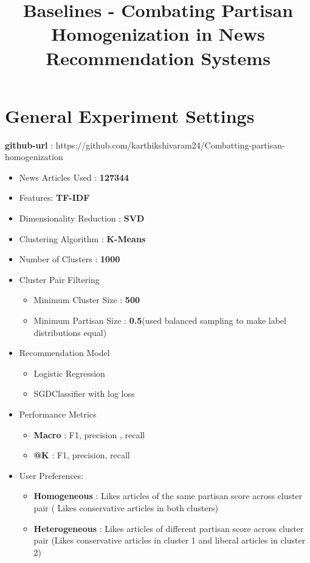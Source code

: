 \documentclass[a4paper,fontsize=9.0pt]{scrartcl}
\title{\textbf{Baselines - Combating Partisan Homogenization in News Recommendation Systems}}
\date{\vspace{-10ex}}
\begin{document}
\maketitle

\tableofcontents

\newpage
\section{General Experiment Settings}
\textbf{github-url} : https://github.com/karthikshivaram24/Combatting-partisan-homogenization
\begin{flushleft}
\begin{itemize}
  \item News Articles Used : \textbf{127344}
  \item Features: \textbf{TF-IDF}
  \item Dimensionality Reduction : \textbf{SVD}
  \item Clustering Algorithm : \textbf{K-Means}
  \item Number of Clusters : \textbf{1000}
  \item Cluster Pair Filtering 
  \begin{itemize}
      \item Minimum Cluster Size : \textbf{500}
      \item Minimum Partisan Size : \textbf{0.5}(used balanced sampling to make label distributions equal)
  \end{itemize}
  \item Recommendation Model
  \begin{itemize}
      \item Logistic Regression
      \item SGDClassifier with log loss
  \end{itemize}
  \item Performance Metrics
  \begin{itemize}
      \item \textbf{Macro} : F1, precision , recall
      \item \textbf{@K} : F1, precision, recall
  \end{itemize}
  \item User Preferences:
  \begin{itemize}
      \item \textbf{Homogeneous} : Likes articles of the same partisan score across cluster pair ( Likes conservative articles in both clusters)
      \item \textbf{Heterogeneous} : Likes articles of different partisan score across cluster pair (Likes conservative articles in cluster 1 and liberal articles in cluster 2)

\end{itemize}
\end{itemize}
\end{flushleft}
\end{document}
